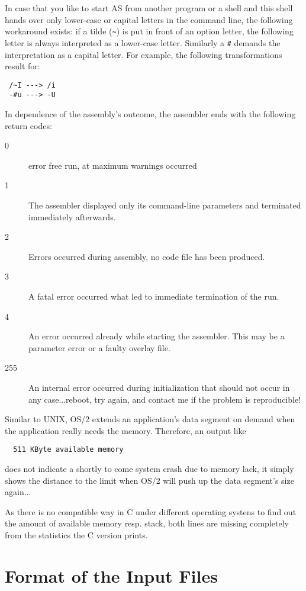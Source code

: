 \documentclass[12pt,twoside]{report}
\newcommand{\tty}[1]{{\tt #1}}
\newcommand{\asname}{{AS}}
\begin{document}
In case that you like to start \asname{} from another program or a shell and
this shell hands over only lower-case or capital letters in the
command line, the following workaround exists: if a tilde (\verb!~!) is put
in front of an option letter, the following letter is always
interpreted as a lower-case letter.  Similarly a \tty{\#} demands the
interpretation as a capital letter.  For example, the following
transformations result for:
\begin{verbatim}
 /~I ---> /i
 -#u ---> -U
\end{verbatim}
In dependence of the assembly's outcome, the assembler ends with
the following return codes:
\begin{description}
\item[0]{error free run, at maximum warnings occurred}
\item[1]{The assembler displayed only its command-line parameters and
         terminated immediately afterwards.}
\item[2]{Errors occurred during assembly, no code file has been produced.}
\item[3]{A fatal error occurred what led to immediate termination of the run.}
\item[4]{An error occurred already while starting the assembler.
         This may be a parameter error or a faulty overlay file.}
\item[255]{An internal error occurred during initialization that should not
         occur in any case...reboot, try again, and contact me if the
         problem is reproducible!}
\end{description}
Similar to UNIX, OS/2  extends an application's data
segment on demand when the application really needs the memory.
Therefore, an output like
\begin{verbatim}
  511 KByte available memory
\end{verbatim}
does not indicate a shortly to come system crash due to memory lack,
it simply shows the distance to the limit when OS/2 will push up the
data segment's size again...

As there is no compatible way in C  under different
operating systens to find out the amount of available memory resp. stack,
both lines are missing completely from the statistics the C version prints.


\section{Format of the Input Files}
\label{AttrTypes}
\end{document}
